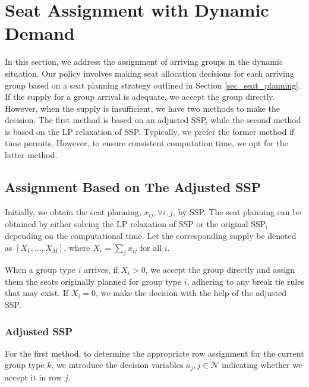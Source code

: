 \section{Seat Assignment with Dynamic Demand}\label{sec_dynamic}

In this section, we address the assignment of arriving groups in the dynamic situation. Our policy involves making seat allocation decisions for each arriving group based on a seat planning strategy outlined in Section \ref{sec_seat_planning}. If the supply for a group arrival is adequate, we accept the group directly. However, when the supply is insufficient, we have two methods to make the decision. The first method is based on an adjusted SSP, while the second method is based on the LP relaxation of SSP. Typically, we prefer the former method if time permits. However, to ensure consistent computation time, we opt for the latter method.


\subsection{Assignment Based on The Adjusted SSP}
Initially, we obtain the seat planning, $x_{ij}, \forall i,j$, by SSP. The seat planning can be obtained by either solving the LP relaxation of SSP or the original SSP, depending on the computational time. Let the corresponding supply be denoted as $[X_1, \ldots, X_M]$, where $X_i = \sum_{j} x_{ij}$ for all $i$.

When a group type $i$ arrives, if $X_i > 0$, we accept the group directly and assign them the seats originally planned for group type $i$, adhering to any break tie rules that may exist. If $X_i = 0$, we make the decision with the help of the adjusted SSP. 

\subsubsection{Adjusted SSP}
For the first method, to determine the appropriate row assignment for the current group type $k$, we introduce the decision variables $a_j, j \in \mathcal{N}$ indicating whether we accept it in row $j$.

